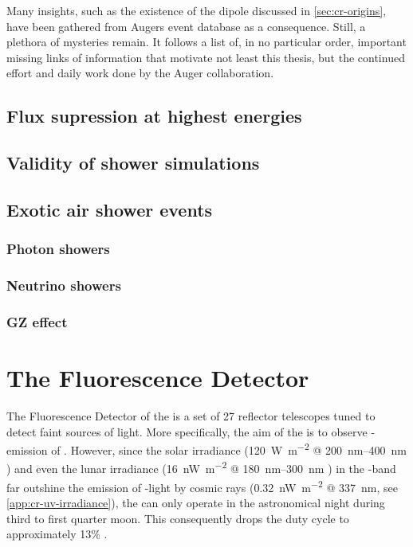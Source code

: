 Many insights, such as the existence of the \CR dipole discussed in
\cref{sec:cr-origins}, have been gathered from Augers event database as a 
consequence. Still, a plethora of mysteries remain. It follows a list of, in no 
particular order, important missing links of information that motivate not least
this thesis, but the continued effort and daily work done by the Auger 
collaboration.

\subsection{Flux supression at highest energies}
\label{ssec:flux-supression}

\subsection{Validity of shower simulations}


\subsection{Exotic air shower events}
\subsubsection{Photon showers}
\subsubsection{Neutrino showers}
\subsubsection{GZ effect}

\section{The Fluorescence Detector}
\label{sec:fd}

The Fluorescence Detector of the \PAO is a set of 27 reflector telescopes tuned
to detect faint sources of \UV light. More specifically, the aim of the \FD is
to observe \UV-emission of \EAS. However, since the solar irradiance 
(\SI{120}{\watt\per\meter\squared} @
\SIrange[range-phrase={--}]{200}{400}{\nano\meter} 
\cite{quemerais_absolute_2013}) and even the lunar irradiance 
(\SI{16}{\nano\watt\per\meter\squared} @
\SIrange[range-phrase={--}]{180}{300}{\nano\meter} 
\cite{lean_contribution_1989}) in the \UV-band far outshine the emission of 
\UV-light by cosmic rays (\SI{0.32}{\nano\watt\per\meter\squared} @ 
\SI{337}{\nano\meter}, see \cref{app:cr-uv-irradiance}), the \FD can only 
operate in the astronomical night during third to first quarter moon. This consequently drops the duty cycle 
to approximately 13\% \cite{abraham_fluorescence_2010}.

